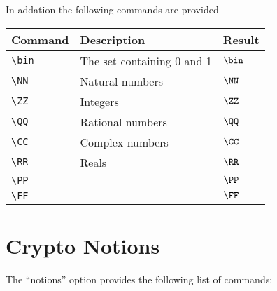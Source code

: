 \documentclass[a4paper]{report}
\begin{document}
  In addation the following commands are provided
  \begin{center}
  \begin{tabular}{l l l}
  \textbf{Command} & \textbf{Description} & \textbf{Result} \\\hline
  \lstinline$\bin$ & The set containing 0 and 1 & $\bin$  \\
  \lstinline$\NN$ & Natural numbers & $\NN$  \\
  \lstinline$\ZZ$ & Integers & $\ZZ$  \\
  \lstinline$\QQ$ & Rational numbers & $\QQ$  \\
  \lstinline$\CC$ & Complex numbers & $\CC$  \\
  \lstinline$\RR$ & Reals & $\RR$  \\
  \lstinline$\PP$ & & $\PP$  \\
  \lstinline$\FF$ & & $\FF$  \\
  \end{tabular}
  \end{center}
  
  \section{Crypto Notions}
  The \enquote{notions} option provides the following list of commands:
  
\end{document}
